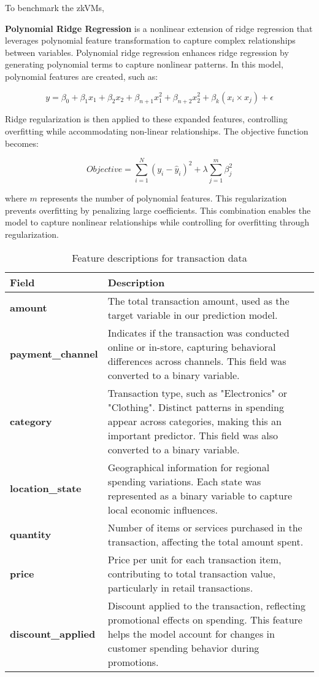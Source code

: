 \documentclass{scrartcl}
\begin{document}
To benchmark the zkVMs,


\textbf{Polynomial Ridge Regression} is a nonlinear extension of ridge regression that leverages polynomial feature transformation to capture complex relationships between variables. Polynomial ridge regression enhances ridge regression by generating polynomial terms to capture nonlinear patterns. In this model, polynomial features are created, such as:

\[
y = \beta_0 + \beta_1 x_1 + \beta_2 x_2 + \beta_{n+1} x_1^2 + \beta_{n+2} x_2^2 + \beta_{k} (x_i \times x_j) + \epsilon
\]

Ridge regularization is then applied to these expanded features, controlling overfitting while accommodating non-linear relationships. The objective function becomes:

\[
Objective = \sum_{i=1}^{N} (y_i - \hat{y}_i)^2 + \lambda \sum_{j=1}^{m} \beta_j^2
\]

where \( m \) represents the number of polynomial features. This regularization prevents overfitting by penalizing large coefficients. This combination enables the model to capture nonlinear relationships while controlling for overfitting through regularization.

\begin{table}[ht!]
\centering
\begin{tabular}{| l | p{10cm} |}
\hline
\textbf{Field} & \textbf{Description} \\
\hline
\textbf{amount} & The total transaction amount, used as the target variable in our prediction model. \\
\hline
\textbf{payment\_channel} & Indicates if the transaction was conducted online or in-store, capturing behavioral differences across channels. This field was converted to a binary variable. \\
\hline
\textbf{category} & Transaction type, such as "Electronics" or "Clothing". Distinct patterns in spending appear across categories, making this an important predictor. This field was also converted to a binary variable. \\
\hline
\textbf{location\_state} & Geographical information for regional spending variations. Each state was represented as a binary variable to capture local economic influences. \\
\hline
\textbf{quantity} & Number of items or services purchased in the transaction, affecting the total amount spent. \\
\hline
\textbf{price} & Price per unit for each transaction item, contributing to total transaction value, particularly in retail transactions. \\
\hline
\textbf{discount\_applied} & Discount applied to the transaction, reflecting promotional effects on spending. This feature helps the model account for changes in customer spending behavior during promotions. \\
\hline
\end{tabular}
\caption{Feature descriptions for transaction data}
\label{tab:transaction_data}
\end{table}
\end{document}
